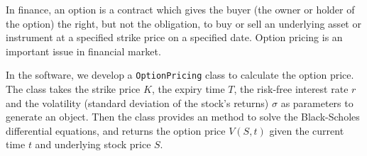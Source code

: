 
In finance, an option is a contract which gives the buyer (the owner or holder
of the option) the right, but not the obligation, to buy or sell an underlying
asset or instrument at a specified strike price on a specified date. Option
pricing is an important issue in financial market. 

In the software, we develop a \texttt{OptionPricing} class to calculate the
option price. The class takes the strike price $K$, the expiry time $T$, the risk-free interest
rate $r$ and the volatility (standard deviation of the stock's returns) $\sigma$
as parameters to generate an object. Then the class provides an method to solve the
Black-Scholes differential equations, and returns the option price $V(S, t)$
given the current time $t$ and underlying stock price $S$.
